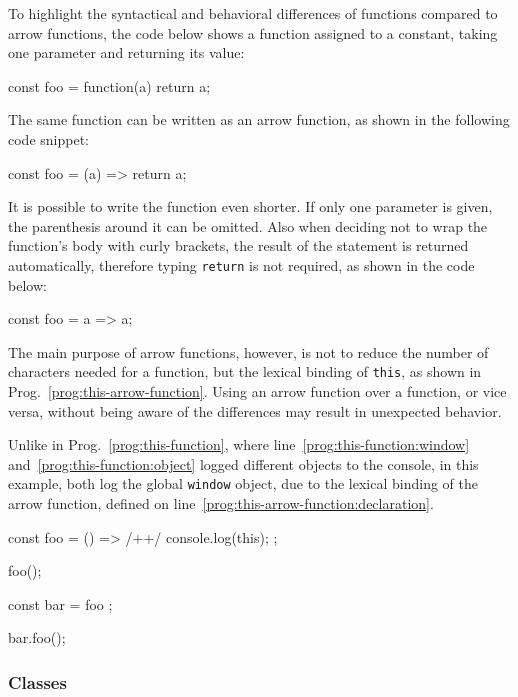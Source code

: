 To highlight the syntactical and behavioral differences of functions compared to arrow functions, the code below shows a function assigned to a constant, taking one parameter and returning its value:
\begin{JsCode}[numbers=none]
const foo = function(a) {
  return a;
}
\end{JsCode}
The same function can be written as an arrow function, as shown in the following code snippet:
\begin{JsCode}[numbers=none]
const foo = (a) => {
  return a;
}
\end{JsCode}
It is possible to write the function even shorter. If only one parameter is given, the parenthesis around it can be omitted. Also when deciding not to wrap the function's body with curly brackets, the result of the statement is returned automatically, therefore typing \texttt{return} is not required, as shown in the code below:
\begin{JsCode}[numbers=none]
const foo = a => a;
\end{JsCode}
The main purpose of arrow functions, however, is not to reduce the number of characters needed for a function, but the lexical binding of \texttt{this}, as shown in Prog.~\ref{prog:this-arrow-function}. Using an arrow function over a function, or vice versa, without being aware of the differences may result in unexpected behavior.%
\begin{program}[h]
\caption{Unlike in Prog.~\ref{prog:this-function}, where line~\ref{prog:this-function:window} and~\ref{prog:this-function:object} logged different objects to the console, in this example, both log the global \texttt{window} object, due to the lexical binding of the arrow function, defined on line~\ref{prog:this-arrow-function:declaration}.}
\label{prog:this-arrow-function}
\begin{JsCode}
const foo = () => { /+\label{prog:this-arrow-function:declaration}+/
  console.log(this);
};

foo();

const bar = { foo };

bar.foo();
\end{JsCode}
\end{program}

\subsubsection{Classes}

